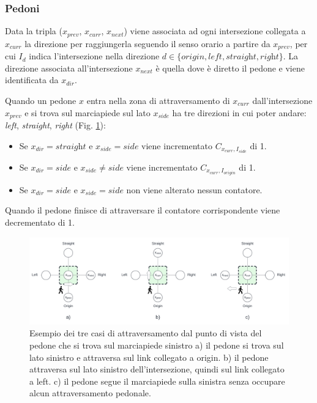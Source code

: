 \subsubsection{Pedoni}

Data la tripla ($x_{prev}$, $x_{curr}$, $x_{next}$) viene associata ad ogni intersezione collegata a $x_{curr}$ la direzione per raggiungerla seguendo il senso orario a partire da $x_{prev}$,
per cui $I_d$ indica l'intersezione nella direzione $d \in \{\textit{origin}, \textit{left}, \textit{straight}, \textit{right}\}$.
%
La direzione associata all'intersezione $x_{next}$ è quella dove è diretto il pedone e viene identificata da $x_{dir}$.

\pagebreak

Quando un pedone $x$ entra nella zona di attraversamento di $x_{curr}$ dall'intersezione $x_{prev}$ e si trova sul marciapiede sul lato $x_{side}$
ha tre direzioni in cui poter andare: \textit{left}, \textit{straight}, \textit{right} (Fig. \ref{fig:pedestria-crossing}):
\begin{itemize}
    \item Se $x_{dir} = \textit{straight}$ e $x_{side} = \textit{side}$ viene incrementato $C_{x_{curr}, I_{\textit{side}}}$ di 1.
    \item Se $x_{dir} = \textit{side}$ e $x_{side} \neq \textit{side}$ viene incrementato $C_{x_{curr}, I_{\textit{origin}}}$ di 1.
    \item Se  $x_{dir} = \textit{side}$ e $x_{side} = \textit{side}$ non viene alterato nessun contatore.
\end{itemize}

Quando il pedone finisce di attraversare il contatore corrispondente viene decrementato di 1.


\begin{figure}[ht]
    \centering
    \includegraphics[width=\textwidth]{images/pedestrian_crossing}
    \caption{
        Esempio dei tre casi di attraversamento dal punto di vista del pedone che si trova sul marciapiede sinistro
        a) il pedone si trova sul lato sinistro e attraversa sul link collegato a origin.
        b) il pedone attraversa sul lato sinistro dell'intersezione, quindi sul link collegato a left.
        c) il pedone segue il marciapiede sulla sinistra senza occupare alcun attraversamento pedonale.
    }
    \label{fig:pedestria-crossing}
\end{figure}


